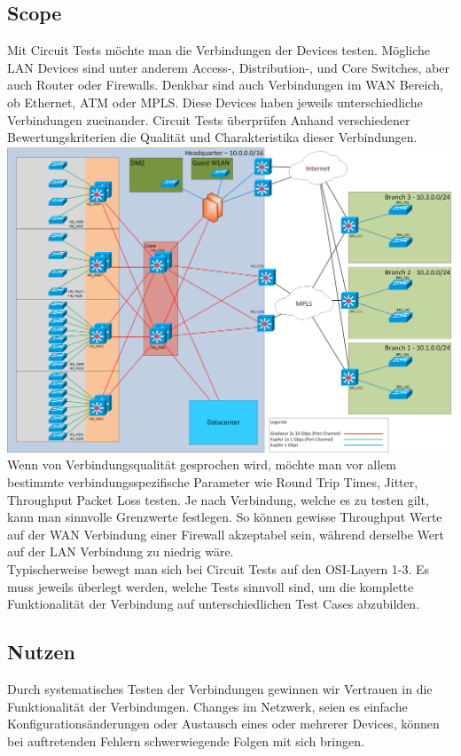 \documentclass[a4,12pt]{scrartcl}
\begin{document}
\subsection{Scope}
Mit Circuit Tests möchte man die Verbindungen der Devices testen. Mögliche LAN Devices sind unter anderem Access-, Distribution-, und Core Switches, aber auch Router oder Firewalls. Denkbar sind auch Verbindungen im WAN Bereich, ob Ethernet, ATM oder MPLS. Diese Devices haben jeweils unterschiedliche Verbindungen zueinander. Circuit Tests überprüfen Anhand verschiedener Bewertungskriterien die Qualität und Charakteristika dieser Verbindungen.\\

\includegraphics[width=1\textwidth]{figures/Netzwerk_physisch.png}\\

\noindent Wenn von Verbindungsqualität gesprochen wird, möchte man vor allem bestimmte verbindungsspezifische Parameter wie Round Trip Times, Jitter, Throughput Packet Loss testen. Je nach Verbindung, welche es zu testen gilt, kann man sinnvolle Grenzwerte festlegen. So können gewisse Throughput Werte auf der WAN Verbindung einer Firewall akzeptabel sein, während derselbe Wert auf der LAN Verbindung zu niedrig wäre.\\

\noindent Typischerweise bewegt man sich bei Circuit Tests auf den OSI-Layern 1-3. Es muss jeweils überlegt werden, welche Tests sinnvoll sind, um die komplette Funktionalität der Verbindung auf unterschiedlichen Test Cases abzubilden.   
\subsection{Nutzen}
Durch systematisches Testen der Verbindungen gewinnen wir Vertrauen in die Funktionalität der Verbindungen. Changes im Netzwerk, seien es einfache Konfigurationsänderungen oder Austausch eines oder mehrerer Devices, können bei auftretenden Fehlern schwerwiegende Folgen mit sich bringen.\\
\end{document}
